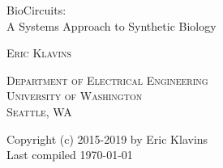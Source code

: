 \documentclass[10pt]{amsbook}
\begin{document}
%
%
\frontmatter

\begin{titlepage}
\begin{center}

\vspace{1in}

{\Huge\textsf{BioCircuits:\\
\vspace{0.25in}
A Systems Approach to Synthetic Biology}}

\vspace{1in}

\textsc{Eric Klavins}

\vspace{0.25in}

\textsc{Department of Electrical Engineering\\
University of Washington\\
Seattle, WA}

\vfill
 
Copyright (c) 2015-2019 by Eric Klavins \\
Last compiled {\large \today}

\end{center}
\end{titlepage}

\setcounter{page}{4}

\tableofcontents

\mainmatter






















\appendix


\backmatter


\end{document}

